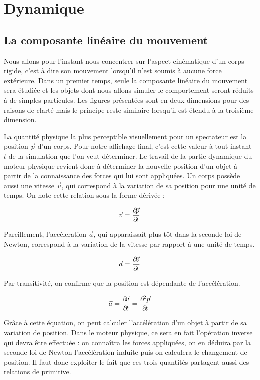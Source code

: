 \section{Dynamique} 

\subsection{La composante linéaire du mouvement}

Nous allons pour l'instant nous concentrer sur l'aspect cinématique d'un corps rigide, c'est à dire son mouvement lorsqu'il n'est soumis à aucune force extérieure. Dans un premier temps, seule la composante linéaire du mouvement sera étudiée et les objets dont nous allons simuler le comportement seront réduits à de simples particules. Les figures présentées sont en deux dimensions pour des raisons de clarté mais le principe reste similaire lorsqu'il est étendu à la troisième dimension.

La quantité physique la plus perceptible visuellement pour un spectateur est la position $\vec p$ d'un corps. Pour notre affichage final, c'est cette valeur à tout instant $t$ de la simulation que l'on veut déterminer. Le travail de la partie dynamique du moteur physique revient donc à déterminer la nouvelle position d'un objet à partir de la connaissance des forces qui lui sont appliquées. Un corps possède aussi une vitesse $\vec v$, qui correspond à la variation de sa position pour une unité de temps. On note cette relation sous la forme dérivée :

\begin{align*}
  \vec{v} = \frac{\partial \! \vec{p}}{\partial \! t}
\end{align*}

Pareillement, l'accéleration $\vec a$, qui apparaissaît plus tôt dans la seconde loi de Newton, correspond à la variation de la vitesse par rapport à une unité de temps.

\begin{align*}
  \vec{a} = \frac{\partial \! \vec{v}}{\partial \! t}
\end{align*}

Par transitivité, on confirme que la position est dépendante de l'accélération.

\begin{align*}
  \vec{a} = \frac{\partial \! \vec{v}}{\partial \! t} = \frac{\partial \!^2 \vec{p}}{\partial \! t}
\end{align*}

Grâce à cette équation, on peut calculer l'accélération d'un objet à partir de sa variation de position. Dans le moteur physique, ce sera en fait l'opération inverse qui devra être effectuée : on connaîtra les forces appliquées, on en déduira par la seconde loi de Newton l'accélération induite puis on calculera le changement de position. Il faut donc exploiter le fait que ces trois quantités partagent aussi des relations de primitive.

